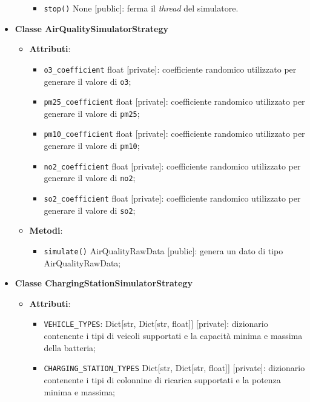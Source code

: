\begin{itemize}
\begin{itemize}
\begin{itemize}
			            \item \texttt{stop()} None [public]: ferma il \textit{thread} del simulatore.
		            \end{itemize}
	      \end{itemize}
	\item \textbf{Classe AirQualitySimulatorStrategy}
	      \begin{itemize}
		      \item \textbf{Attributi}:
		            \begin{itemize}
			            \item \texttt{o3\_coefficient} float [private]: coefficiente randomico utilizzato per generare il valore di \texttt{o3};
			            \item \texttt{pm25\_coefficient} float [private]: coefficiente randomico utilizzato per generare il valore di \texttt{pm25};
			            \item \texttt{pm10\_coefficient} float [private]: coefficiente randomico utilizzato per generare il valore di \texttt{pm10};
			            \item \texttt{no2\_coefficient} float [private]: coefficiente randomico utilizzato per generare il valore di \texttt{no2};
			            \item \texttt{so2\_coefficient} float [private]: coefficiente randomico utilizzato per generare il valore di \texttt{so2};
		            \end{itemize}
		      \item \textbf{Metodi}:
		            \begin{itemize}
			            \item \texttt{simulate()} AirQualityRawData [public]: genera un dato di tipo AirQualityRawData;
		            \end{itemize}
	      \end{itemize}
	\item \textbf{Classe ChargingStationSimulatorStrategy}
	      \begin{itemize}
	      \end{itemize}
	      \begin{itemize}
		      \item \textbf{Attributi}:
		            \begin{itemize}
			            \item \texttt{VEHICLE\_TYPES}: Dict[str, Dict[str, float]] [private]: dizionario contenente i tipi di veicoli supportati e la capacità minima e massima della batteria;
			            \item \texttt{CHARGING\_STATION\_TYPES} Dict[str, Dict[str, float]] [private]: dizionario contenente i tipi di colonnine di ricarica supportati e la potenza minima e massima;

\end{itemize}
\end{itemize}
\end{itemize}
